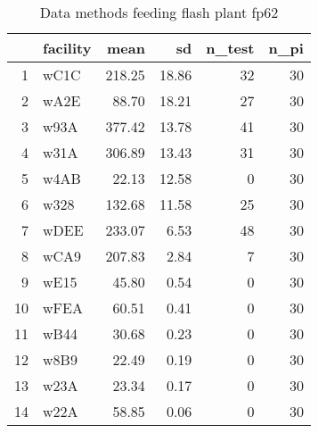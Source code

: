 \begin{table}[H]
\centering
\begin{tabular}{rlrrrr}
  \hline
 & facility & mean & sd & n\_test & n\_pi \\ 
  \hline
1 & wC1C & 218.25 & 18.86 &  32 &  30 \\ 
  2 & wA2E & 88.70 & 18.21 &  27 &  30 \\ 
  3 & w93A & 377.42 & 13.78 &  41 &  30 \\ 
  4 & w31A & 306.89 & 13.43 &  31 &  30 \\ 
  5 & w4AB & 22.13 & 12.58 &   0 &  30 \\ 
  6 & w328 & 132.68 & 11.58 &  25 &  30 \\ 
  7 & wDEE & 233.07 & 6.53 &  48 &  30 \\ 
  8 & wCA9 & 207.83 & 2.84 &   7 &  30 \\ 
  9 & wE15 & 45.80 & 0.54 &   0 &  30 \\ 
  10 & wFEA & 60.51 & 0.41 &   0 &  30 \\ 
  11 & wB44 & 30.68 & 0.23 &   0 &  30 \\ 
  12 & w8B9 & 22.49 & 0.19 &   0 &  30 \\ 
  13 & w23A & 23.34 & 0.17 &   0 &  30 \\ 
  14 & w22A & 58.85 & 0.06 &   0 &  30 \\ 
   \hline
\end{tabular}
\caption{Data methods feeding flash plant fp62} 
\label{tab:well_summaries_fp15}
\end{table}
